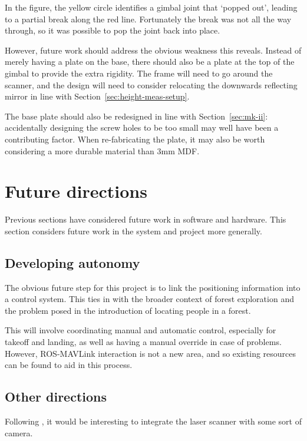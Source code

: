\documentclass[12pt,oneside,a4paper]{book}
\begin{document}
In the figure, the yellow circle identifies a gimbal joint that
`popped out', leading to a partial break along the red
line. Fortunately the break was not all the way through, so it was
possible to pop the joint back into place.

However, future work should address the obvious weakness this
reveals. Instead of merely having a plate on the base, there should
also be a plate at the top of the gimbal to provide the extra
rigidity. The frame will need to go around the scanner, and the design
will need to consider relocating the downwards reflecting mirror in
line with Section~\ref{sec:height-meas-setup}.

The base plate should also be redesigned in line with
Section~\ref{sec:mk-ii}: accidentally designing the screw holes to be
too small may well have been a contributing factor. When re-fabricating
the plate, it may also be worth considering a more durable material
than 3mm MDF.

\section{Future directions}
\label{sec:future-work}

Previous sections have considered future work in software and
hardware. This section considers future work in the system and project
more generally.

\subsection{Developing autonomy}
\label{sec:developing-autonomy}

The obvious future step for this project is to link the positioning
information into a control system. This ties in with the broader
context of forest exploration and the problem posed in the
introduction of locating people in a forest.

This will involve coordinating manual and automatic control,
especially for takeoff and landing, as well as having a manual
override in case of problems. However, ROS-MAVLink interaction is not
a new area, and so existing resources can be found to aid in this process.

\subsection{Other directions}
\label{sec:other-directions}

Following \cite{achtelik2009stereo}, it would be interesting to
integrate the laser scanner with some sort of camera.
\end{document}
